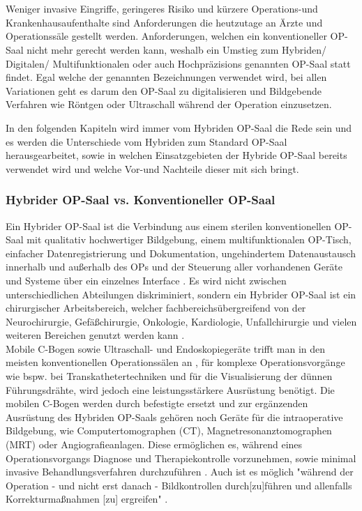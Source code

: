 \chapter{}
\label{sec:overview}

Weniger invasive Eingriffe, geringeres Risiko und kürzere Operations-und Krankenhausaufenthalte sind Anforderungen die heutzutage an Ärzte und Operationssäle gestellt werden. Anforderungen, welchen ein konventioneller OP-Saal nicht mehr gerecht werden kann, weshalb ein Umstieg zum Hybriden/ Digitalen/ Multifunktionalen oder auch Hochpräzisions genannten OP-Saal statt findet. Egal welche der genannten Bezeichnungen verwendet wird, bei allen Variationen geht es darum den OP-Saal zu digitalisieren und Bildgebende Verfahren wie Röntgen oder Ultraschall während der Operation einzusetzen.

In den folgenden Kapiteln wird immer vom Hybriden OP-Saal die Rede sein und es werden die Unterschiede vom Hybriden zum Standard OP-Saal herausgearbeitet, sowie in welchen Einsatzgebieten der Hybride OP-Saal bereits verwendet wird und welche Vor-und Nachteile dieser mit sich bringt.


\subsection{Hybrider OP-Saal vs. Konventioneller OP-Saal} 

Ein Hybrider OP-Saal ist die Verbindung aus einem sterilen konventionellen OP-Saal mit qualitativ hochwertiger Bildgebung, einem multifunktionalen OP-Tisch, einfacher Datenregistrierung und Dokumentation, ungehindertem Datenaustausch innerhalb und außerhalb des OPs und der Steuerung aller vorhandenen Geräte und Systeme über ein einzelnes Interface \cite{HybriderVsKonventioneller,KarlStorz}. Es wird nicht zwischen unterschiedlichen Abteilungen diskriminiert, sondern ein Hybrider OP-Saal ist ein chirurgischer Arbeitsbereich, welcher fachbereichsübergreifend von der Neurochirurgie, Gefäßchirurgie, Onkologie, Kardiologie, Unfallchirurgie und vielen weiteren Bereichen genutzt werden kann \cite{Getinge}.\\
Mobile C-Bogen sowie Ultraschall- und Endoskopiegeräte trifft man in den meisten konventionellen Operationssälen an \cite{TechnicalConsiderations}, für komplexe Operationsvorgänge wie bspw. bei Transkathetertechniken und für die Visualisierung der dünnen Führungsdrähte, wird jedoch eine leistungsstärkere Ausrüstung benötigt. Die mobilen C-Bogen werden durch befestigte ersetzt und zur ergänzenden Ausrüstung des Hybriden OP-Saals gehören noch Geräte für die intraoperative Bildgebung, wie Computertomographen (CT), Magnetresonanztomographen (MRT) oder Angiografieanlagen. Diese ermöglichen es, während eines Operationsvorgangs Diagnose und Therapiekontrolle vorzunehmen, sowie minimal invasive Behandlungsverfahren durchzuführen \cite{SHG-Kliniken}. Auch ist es möglich "während der Operation - und nicht erst danach - Bildkontrollen durch[zu]führen und allenfalls Korrekturmaßnahmen [zu] ergreifen" \cite{OPderZukunft}.


